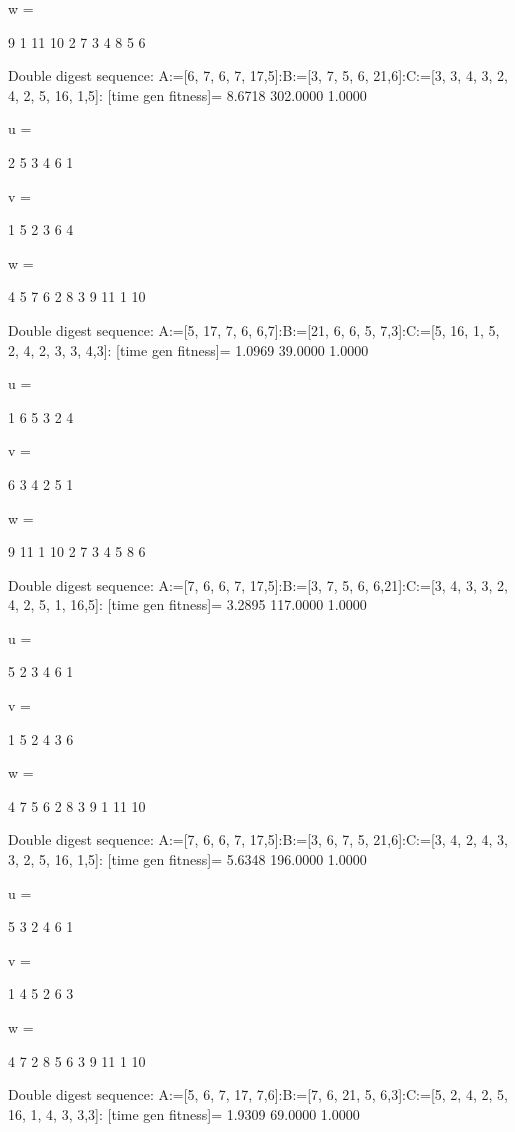 w =

     9     1    11    10     2     7     3     4     8     5     6

Double digest sequence:
A:=[6, 7, 6, 7, 17,5]:B:=[3, 7, 5, 6, 21,6]:C:=[3, 3, 4, 3, 2, 4, 2, 5, 16, 1,5]:
[time gen fitness]=
    8.6718  302.0000    1.0000


u =

     2     5     3     4     6     1


v =

     1     5     2     3     6     4


w =

     4     5     7     6     2     8     3     9    11     1    10

Double digest sequence:
A:=[5, 17, 7, 6, 6,7]:B:=[21, 6, 6, 5, 7,3]:C:=[5, 16, 1, 5, 2, 4, 2, 3, 3, 4,3]:
[time gen fitness]=
    1.0969   39.0000    1.0000


u =

     1     6     5     3     2     4


v =

     6     3     4     2     5     1


w =

     9    11     1    10     2     7     3     4     5     8     6

Double digest sequence:
A:=[7, 6, 6, 7, 17,5]:B:=[3, 7, 5, 6, 6,21]:C:=[3, 4, 3, 3, 2, 4, 2, 5, 1, 16,5]:
[time gen fitness]=
    3.2895  117.0000    1.0000


u =

     5     2     3     4     6     1


v =

     1     5     2     4     3     6


w =

     4     7     5     6     2     8     3     9     1    11    10

Double digest sequence:
A:=[7, 6, 6, 7, 17,5]:B:=[3, 6, 7, 5, 21,6]:C:=[3, 4, 2, 4, 3, 3, 2, 5, 16, 1,5]:
[time gen fitness]=
    5.6348  196.0000    1.0000


u =

     5     3     2     4     6     1


v =

     1     4     5     2     6     3


w =

     4     7     2     8     5     6     3     9    11     1    10

Double digest sequence:
A:=[5, 6, 7, 17, 7,6]:B:=[7, 6, 21, 5, 6,3]:C:=[5, 2, 4, 2, 5, 16, 1, 4, 3, 3,3]:
[time gen fitness]=
    1.9309   69.0000    1.0000


